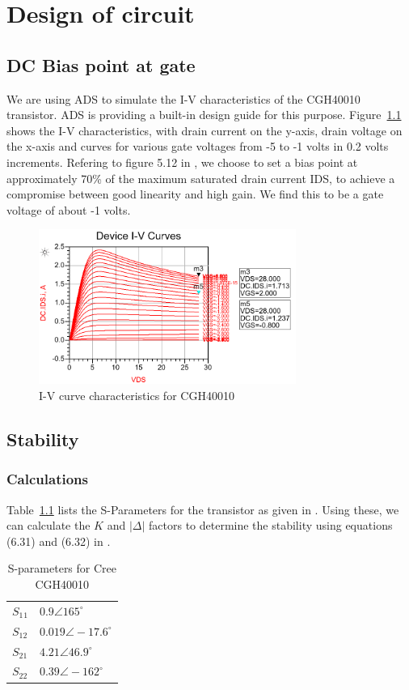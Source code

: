 \chapter{Design of circuit}
  
  \section{DC Bias point at gate}

  We are using ADS to simulate the I-V characteristics of the CGH40010 transistor. ADS is providing a built-in design guide for this purpose. Figure~\ref{fig:fig_IV} shows the I-V characteristics, with drain current on the y-axis, drain voltage on the x-axis and curves for various gate voltages from -5 to -1 volts in 0.2 volts increments. Refering to figure 5.12 in \cite[p.~200]{AmpRobertson}, we choose to set a bias point at approximately 70\% of the maximum saturated drain current IDS, to achieve a compromise between good linearity and high gain. We find this to be a gate voltage of about -1 volts.

  \begin{figure}[h]
	  \label{fig:fig_IV}
	  \centering
	  \includegraphics[width=0.75\textwidth]{img/01_IVCurve.png}
	  \caption{I-V curve characteristics for CGH40010}
  \end{figure}

  \section{Stability}

  \subsection{Calculations}
  Table~\ref{tab:cree_sparm} lists the S-Parameters for the transistor as given in \cite{CreeDS}. Using these, we can calculate the $K$ and $\lvert \Delta \rvert$ factors to determine the stability using equations (6.31) and (6.32) in \cite{Pozar}.
  \begin{table}[h]
	  \label{tab:cree_sparm}
	  \centering
  \begin{tabular}{l l}
	  $S_1$$_1$ & $0.9 \angle 165^{\circ}$ \\
	  $S_{12}$ & $0.019 \angle -17.6^{\circ}$ \\
	  $S_{21}$ & $4.21 \angle 46.9^{\circ}$ \\
	  $S_{22}$ & $0.39 \angle -162^{\circ}$ \\
  \end{tabular}
  \caption{S-parameters for Cree CGH40010}
  \end{table}

